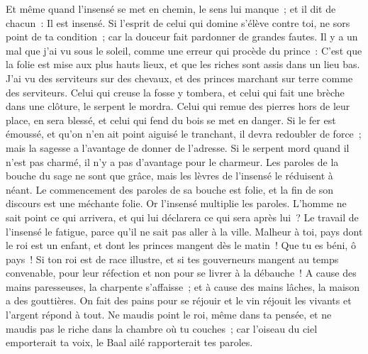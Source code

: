 \begin{multicols}{2}
Et même quand l'insensé se met en chemin, le sens lui manque~; et il dit de chacun~: Il est insensé. 
Si l'esprit de celui qui domine s'élève contre toi, ne sors point de ta condition~; car la douceur fait pardonner de grandes fautes. 
Il y a un mal que j'ai vu sous le soleil, comme une erreur qui procède du prince~:
C'est que la folie est mise aux plus hauts lieux, et que les riches sont assis dans un lieu bas. 
J'ai vu des serviteurs sur des chevaux, et des princes marchant sur terre comme des serviteurs.
Celui qui creuse la fosse y tombera, et celui qui fait une brèche dans une clôture, le serpent le mordra.
Celui qui remue des pierres hors de leur place, en sera blessé, et celui qui fend du bois se met en danger.
Si le fer est émoussé, et qu'on n'en ait point aiguisé le tranchant, il devra redoubler de force~; mais la sagesse a l'avantage de donner de l'adresse.
Si le serpent mord quand il n'est pas charmé, il n'y a pas d'avantage pour le charmeur. 
Les paroles de la bouche du sage ne sont que grâce, mais les lèvres de l'insensé le réduisent à néant.
Le commencement des paroles de sa bouche est folie, et la fin de son discours est une méchante folie.
Or l'insensé multiplie les paroles. L'homme ne sait point ce qui arrivera, et qui lui déclarera ce qui sera après lui~?
Le travail de l'insensé le fatigue, parce qu'il ne sait pas aller à la ville.
Malheur à toi, pays dont le roi est un enfant, et dont les princes mangent dès le matin~!
Que tu es béni, ô pays~! Si ton roi est de race illustre, et si tes gouverneurs mangent au temps convenable, pour leur réfection et non pour se livrer à la débauche~! 
A cause des mains paresseuses, la charpente s'affaisse~; et à cause des mains lâches, la maison a des gouttières.
On fait des pains pour se réjouir et le vin réjouit les vivants et l'argent répond à tout.
Ne maudis point le roi, même dans ta pensée, et ne maudis pas le riche dans la chambre où tu couches~; car l'oiseau du ciel emporterait ta voix, le Baal ailé rapporterait tes paroles.

\end{multicols}
